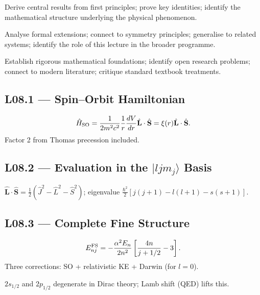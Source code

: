 \quad
Derive central results from first principles; prove key identities; identify
the mathematical structure underlying the physical phenomenon.

\quad
Analyse formal extensions; connect to symmetry principles; generalise to
related systems; identify the role of this lecture in the broader programme.

\quad
Establish rigorous mathematical foundations; identify open research problems;
connect to modern literature; critique standard textbook treatments.


\subsection*{L08.1 — Spin–Orbit Hamiltonian}
\begin{tcolorbox}[lecturebox, title={SO Hamiltonian with Thomas Correction}]
\begin{equation}
  \hat{H}_{\rm SO} = \frac{1}{2m^2c^2}\frac{1}{r}\frac{dV}{dr}\hat{\mathbf{L}}\cdot\hat{\mathbf{S}}
  = \xi(r)\hat{\mathbf{L}}\cdot\hat{\mathbf{S}}.
  \label{eq:L08.1}
\end{equation}
Factor 2 from Thomas precession included.
\end{tcolorbox}

\subsection*{L08.2 — Evaluation in the $|ljm_j\rangle$ Basis}
$\hat{\mathbf{L}}\cdot\hat{\mathbf{S}} = \frac{1}{2}(\hat{J}^2-\hat{L}^2-\hat{S}^2)$;
eigenvalue $\frac{\hbar^2}{2}[j(j+1)-l(l+1)-s(s+1)]$.

\subsection*{L08.3 — Complete Fine Structure}
\begin{tcolorbox}[lecturebox, title={Fine-Structure Formula}]
\begin{equation}
  E_{nj}^{\rm FS} = -\frac{\alpha^2 E_n}{2n^2}\left[\frac{4n}{j+1/2}-3\right].
  \label{eq:L08.2}
\end{equation}
Three corrections: SO + relativistic KE + Darwin (for $l=0$).
\end{tcolorbox}
$2s_{1/2}$ and $2p_{1/2}$ degenerate in Dirac theory; Lamb shift (QED) lifts this.


